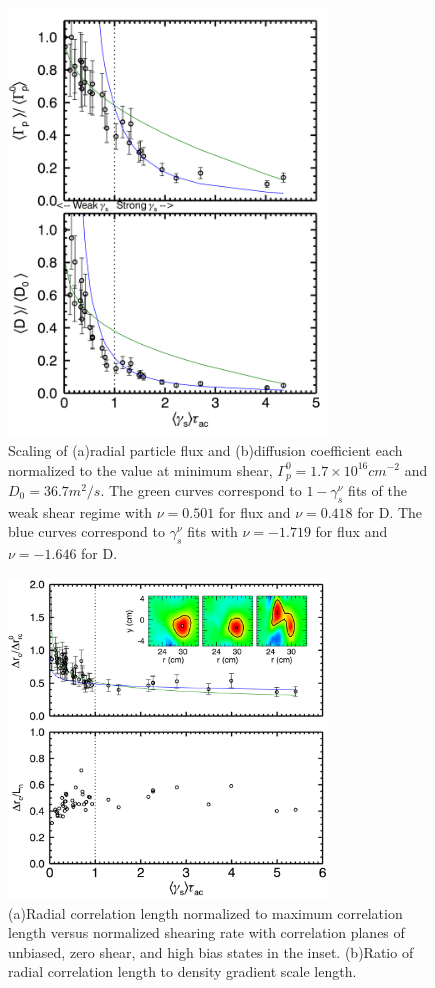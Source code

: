 \documentclass[aip,pop,amsmath,amssymb,preprint,superscriptaddress]{revtex4-1} %
\begin{document}
\begin{figure}[!htbp]
\centerline{
\includegraphics[width=8.5cm]{fluxandD}}
\caption{\label{fig:fluxandD} Scaling of (a)radial particle flux and (b)diffusion coefficient each normalized to the value at minimum shear, $\Gamma_{p}^{0} = 1.7\times10^{16} cm^{-2}$ and $D_{0} = 36.7 m^{2}/s$. The green curves correspond to $1-\gamma_{s}^{\nu}$ fits of the weak shear regime with $\nu = 0.501$ for flux and $\nu = 0.418$ for D. The blue curves correspond to $\gamma_{s}^{\nu}$ fits with $\nu = -1.719$ for flux and $\nu = -1.646$ for D.}
\end{figure}

\begin{figure}[!htbp]
\centerline{
\includegraphics[width=8.5cm]{RadCorrLn}}
\caption{\label{fig:radcorr} (a)Radial correlation length normalized to maximum correlation length versus normalized shearing rate with correlation planes of unbiased, zero shear, and high bias states in the inset. (b)Ratio of radial correlation length to density gradient scale length.}
\end{figure}
\end{document}
